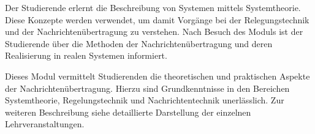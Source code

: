 \begin{module}
\begin{styleenv}
\begin{recommendations}
\end{recommendations}
\end{styleenv}

\begin{learningoutcomes}
Der Studierende erlernt die Beschreibung von Systemen mittels Systemtheorie. Diese Konzepte werden verwendet, um damit Vorgänge bei der Relegungstechnik und der Nachrichtenübertragung zu verstehen. Nach Besuch des Moduls ist der Studierende über die Methoden der Nachrichtenübertragung und deren Realisierung in realen Systemen informiert.


\end{learningoutcomes}

\begin{content}
Dieses Modul vermittelt Studierenden die theoretischen und praktischen Aspekte der Nachrichtenübertragung. Hierzu sind Grundkenntnisse in den Bereichen Systemtheorie, Regelungstechnik und Nachrichtentechnik unerlässlich. Zur weiteren Beschreibung siehe detaillierte Darstellung der einzelnen Lehrveranstaltungen.


\end{content}



\end{module}

